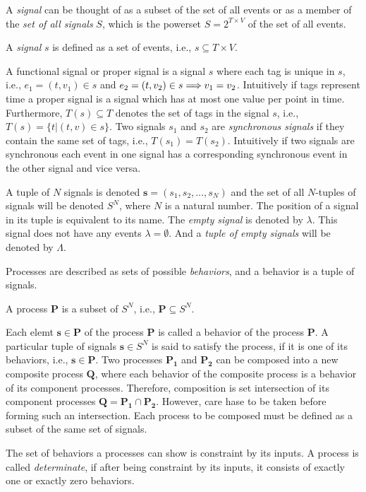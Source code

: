 A \emph{signal} can be thought of as a subset of the set of all events or as
a member of the \emph{set of all signals} $S$, which is the powerset $S = 2^{T \times V}$
of the set of all events.
\begin{sdefinition}
A \emph{signal} $s$ is defined as a set of events, i.e., $s \subseteq T \times V$.
\end{sdefinition}
A functional signal or proper signal is a signal $s$ where each tag is unique in $s$,
i.e., $e_1 = (t,v_1) \in s$ and $e_2 = (t,v_2) \in s \Longrightarrow v_1 = v_2$.
Intuitively if tags represent time a proper signal is a signal which has
at most one value per point in time. Furthermore, $T(s) \subseteq T$ denotes
the set of tags in the signal $s$, i.e., $T(s) = \{t|(t,v) \in s\}$.
Two signals $s_1$ and $s_2$ are \emph{synchronous signals} if they contain
the same set of tags, i.e., $T(s_1) = T(s_2)$.
Intuitively if two signals are synchronous each event in one
signal has a corresponding synchronous event in the other signal and vice versa.

A tuple of $N$ signals is denoted $\mathbf{s} = (s_1, s_2, \dots, s_N)$ and the
set of all $N$-tuples of signals will be denoted $S^N$, where $N$ is a
natural number. The position of a signal in its tuple is equivalent
to its name. The \emph{empty signal} is denoted by $\lambda$. This
signal does not have any events $\lambda = \emptyset$. And a \emph{tuple
of empty signals} will be denoted by $\Lambda$.

Processes are described as sets of possible \emph{behaviors}, and
a behavior is a tuple of signals.
\begin{sdefinition}
A process $\mathbf{P}$ is a subset of $S^N$, i.e., $\mathbf{P} \subseteq S^N$.
\end{sdefinition}
Each elemt $\mathbf{s} \in \mathbf{P}$ of the process $\mathbf{P}$ is
called a behavior of the process $\mathbf{P}$. A particular tuple
of signals $\mathbf{s} \in S^N$ is said to satisfy the process,
if it is one of its behaviors, i.e., $\mathbf{s} \in \mathbf{P}$.
Two processes $\mathbf{P_1}$ and $\mathbf{P_2}$ can be composed into
a new composite process $\mathbf{Q}$, where
each behavior of the composite process is a behavior of its
component processes. Therefore, composition is set intersection of
its component processes $\mathbf{Q} = \mathbf{P_1} \cap \mathbf{P_2}$.
However, care hase to be taken before forming such an intersection.
Each process to be composed must be defined as a subset of the same
set of signals.

The set of behaviors a processes can show is constraint
by its inputs. A process is called \emph{determinate}, if after being
constraint by its inputs, it consists of exactly one or exactly
zero behaviors.

